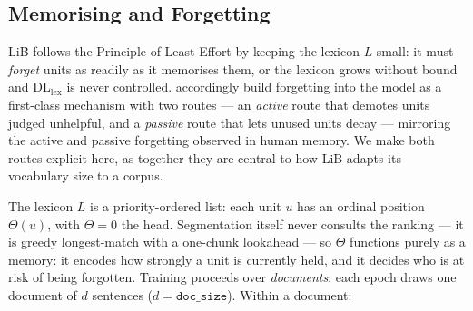 
\newcommand{\TODO}[1]{\textcolor{todocolor}{[\textbf{TODO}: #1]}}


\subsection{Memorising and Forgetting}
\label{sec:forgetting}

LiB follows the Principle of Least Effort by keeping the lexicon $L$ small: it
must \emph{forget} units as readily as it memorises them, or the lexicon grows
without bound and $\mathrm{DL}_\mathrm{lex}$ is never controlled.
\citet{yang2020less} accordingly build forgetting into the model as a
first-class mechanism with two routes — an \emph{active} route that demotes
units judged unhelpful, and a \emph{passive} route that lets unused units decay
— mirroring the active and passive forgetting observed in human memory.
We make both routes explicit here, as together they are central to how LiB
adapts its vocabulary size to a corpus.

The lexicon $L$ is a priority-ordered list: each unit $u$ has an ordinal
position $\Theta(u)$, with $\Theta=0$ the head. Segmentation itself never
consults the ranking — it is greedy longest-match with a one-chunk lookahead —
so $\Theta$ functions purely as a memory: it encodes how strongly a unit is
currently held, and it decides who is at risk of being forgotten.
Training proceeds over \emph{documents}: each epoch draws one document of
$d$ sentences ($d=\texttt{doc\_size}$). Within a document:

